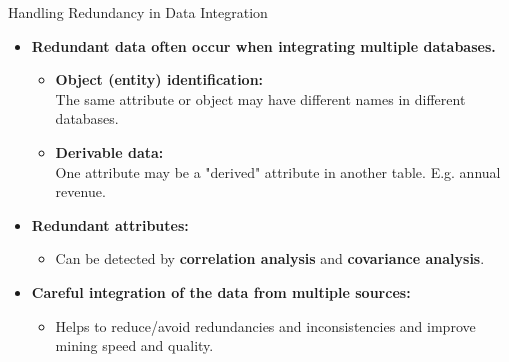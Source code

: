 \begin{frame}{Handling Redundancy in Data Integration}
	\begin{itemize}
		\item \textbf{Redundant data often occur when integrating multiple 
		databases.}
		\begin{itemize}
			\item \textbf{Object (entity) identification:} \\
			The same attribute or object may have different names in different 
			databases.
			\item \textbf{Derivable data:}\\
			One attribute may be a "derived" attribute in another table. E.g. 
			annual revenue.
		\end{itemize}
		\item \textbf{Redundant attributes:}
		\begin{itemize}
			\item Can be detected by \textbf{\color{airforceblue}correlation 
			analysis} and \textbf{\color{airforceblue}covariance analysis}.
		\end{itemize}
		\item \textbf{Careful integration of the data from multiple sources:}
		\begin{itemize}
			\item Helps to reduce/avoid redundancies and inconsistencies and 
			improve mining speed and quality.
		\end{itemize}
	\end{itemize}
\end{frame}

